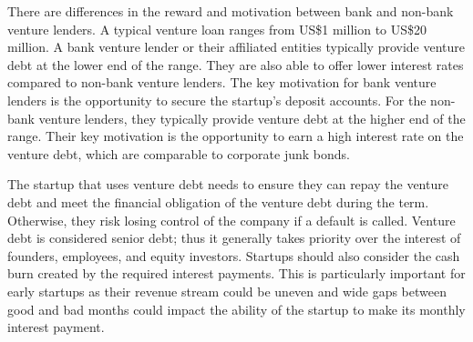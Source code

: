 \documentclass[11pt]{article}
\begin{document}
There are differences in the reward and motivation between bank and non-bank venture lenders. A typical venture loan ranges from US\$1 million to US\$20 million. A bank venture lender or their affiliated entities typically provide venture debt at the lower end of the range. They are also able to offer lower interest rates compared to non-bank venture lenders. The key motivation for bank venture lenders is the opportunity to secure the startup's deposit accounts. For the non-bank venture lenders, they typically provide venture debt at the higher end of the range. Their key motivation is the opportunity to earn a high interest rate on the venture debt, which are comparable to corporate junk bonds.

The startup that uses venture debt needs to ensure they can repay the venture debt and meet the financial obligation of the venture debt during the term. Otherwise, they risk losing control of the company if a default is called. Venture debt is considered senior debt; thus it generally takes priority over the interest of founders, employees, and equity investors. Startups should also consider the cash burn created by the required interest payments. This is particularly important for early startups as their revenue stream could be uneven and wide gaps between good and bad months could impact the ability of the startup to make its monthly interest payment.
\end{document}
